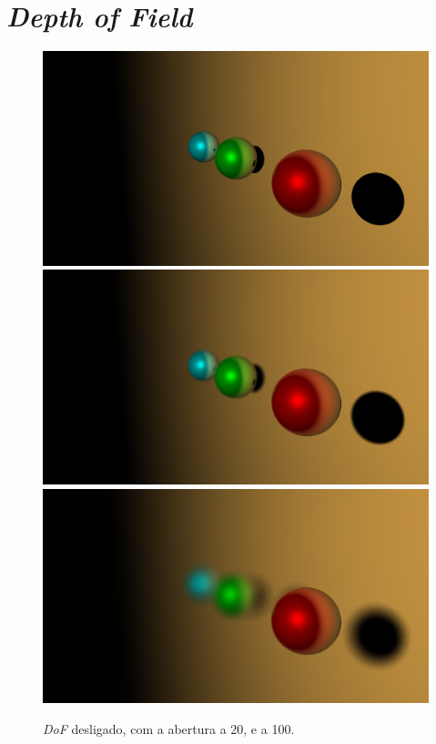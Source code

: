 \documentclass{article}
\begin{document}
        
    \section*{\textit{Depth of Field}}
        \par

        \begin{figure}[h]
            \centering
            \includegraphics[scale=0.08]{dof1}
            \includegraphics[scale=0.08]{dof20}
            \includegraphics[scale=0.08]{dof100}
            \caption{\textit{DoF} desligado, com a abertura a 20, e a 100.}
        \end{figure}  
\end{document}
